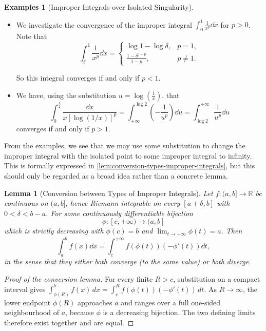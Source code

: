 \documentclass[11pt]{article}
\numberwithin{equation}{section}
\newtheorem{lemma}[theorem]{Lemma}
\theoremstyle{definition}
\newtheorem{examples}[theorem]{Examples}
\theoremstyle{remark}
\newcommand{\pqty}[1]{\left(#1\right)}
\newcommand{\flatfrac}[2]{\frac{#1}{#2}}
\newcommand{\cointv}[2]{[#1,#2)}
\newcommand{\ocintv}[2]{(#1,#2]}
\newcommand{\functiondomain}[3]{#1:#2\to #3}
\newcommand{\RR}{\mathbb R}
\newcommand{\plusinfty}{+\infty}
\begin{document}
\begin{examples}[Improper Integrals over Isolated Singularity]\label{analysis-unit-0196}
    \label{ex:improper-integral-isolated-singularity}%
    \begin{itemize}
        \item We investigate the convergence of the improper integral \(\int_{0}^{1} \frac{1}{x^p} \dd{x}\) for \(p > 0\). Note that
        \[
            \int_{\delta}^{1} \frac{1}{x^p} \dd{x} = \begin{cases}
                \log 1 - \log \delta, & p = 1, \\
                \frac{1-\delta^{1-p}}{1-p}, & p\ne1.
            \end{cases}
        \]

        So this integral converges if and only if \(p < 1\).

        \item We have, using the substitution \(u = \log\pqty{\flatfrac{1}{x}}\), that
        \[
            \int_{0}^{\frac12}\frac{\dd{x}}{x[\log(1/x)]^p} = \int_{\plusinfty}^{\log 2} \pqty{- \frac{1}{u^p}} \dd{u} = \int_{\log 2}^{\plusinfty} \frac{1}{u^p} \dd{u}
        \]
        converges if and only if \(p > 1\).
    \end{itemize}
\end{examples}

From the examples, we see that we may use some substitution to change the improper integral with the isolated point to some improper integral to infinity. This is formally expressed in \autoref{lem:conversion-types-improper-integrals}, but this should only be regarded as a broad idea rather than a concrete lemma.

\begin{lemma}[Conversion between Types of Improper Integrals]\label{analysis-unit-0197}
    \label{lem:conversion-types-improper-integrals}%
    Let \(\functiondomain{f}{\ocintv{a}{b}}{\RR}\) be continuous on \((a,b]\), hence Riemann integrable on every \([a+\delta,b]\) with \(0<\delta<b-a\). For some continuously differentiable bijection
    \[
        \functiondomain{\phi}{\cointv{c}{\plusinfty}}{\ocintv{a}{b}}
    \]
    which is strictly decreasing with \(\phi\pqty{c} = b\) and \(\lim_{t \to \plusinfty} \phi\pqty{t} = a\). Then
    \[
        \int_{a}^{b} f\pqty{x} \dd{x} = \int_{c}^{\plusinfty} f\pqty{\phi\pqty{t}} \pqty{- \phi'\pqty{t}} \dd{t},
    \]
    in the sense that they either both converge (to the same value) or both diverge.
\end{lemma}
\begin{proof}[Proof of the conversion lemma]
For every finite \(R>c\), substitution on a compact interval gives
\(\int_{\phi(R)}^b f(x)\,dx=\int_c^R f(\phi(t))(-\phi'(t))\,dt\).
As \(R\to\infty\), the lower endpoint \(\phi(R)\) approaches \(a\) and ranges
over a full one-sided neighbourhood of \(a\), because \(\phi\) is a decreasing
bijection. The two defining limits therefore exist together and are equal.
\end{proof}
\end{document}
